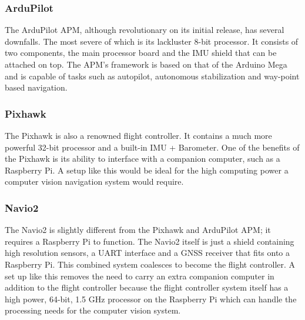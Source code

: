 		\subsubsection{ArduPilot}
			The ArduPilot APM, although revolutionary on its initial release, has several downfalls. The most severe of which is its lackluster 8-bit processor. It consists of two components, the main processor board and the IMU shield that can be attached on top. The APM’s framework is based on that of the Arduino Mega and is capable of tasks such as autopilot, autonomous stabilization and way-point based navigation.

		\subsubsection{Pixhawk}
			The Pixhawk is also a renowned flight controller. It contains a much more powerful 32-bit processor and a built-in IMU + Barometer. One of the benefits of the Pixhawk is its ability to interface with a companion computer, such as a Raspberry Pi. A setup like this would be ideal for the high computing power a computer vision navigation system would require.

		\subsubsection{Navio2}
			The Navio2 is slightly different from the Pixhawk and ArduPilot APM; it requires a Raspberry Pi to function. The Navio2 itself is just a shield containing high resolution sensors, a UART interface and a GNSS receiver that fits onto a Raspberry Pi. This combined system coalesces to become the flight controller. A set up like this removes the need to carry an extra companion computer in addition to the flight controller because the flight controller system itself has a high power, 64-bit, 1.5 GHz processor on the Raspberry Pi which can handle the processing needs for the computer vision system.
